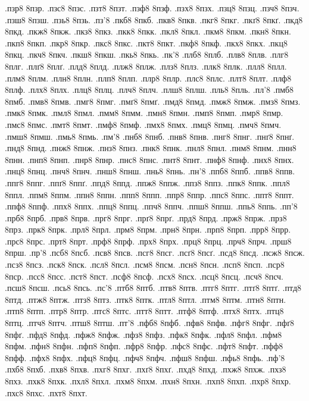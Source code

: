 {.пзр8 8пзр.
.пзс8 8пзс.
.пзт8 8пзт.
.пзф8 8пзф.
.пзх8 8пзх.
.пзц8 8пзц.
.пзч8 8пзч.
.пзш8 8пзш.
.пзь8 8пзь.
.пз'8
.пкб8 8пкб.
.пкв8 8пкв.
.пкг8 8пкг.
.пкґ8 8пкґ.
.пкд8 8пкд.
.пкж8 8пкж.
.пкз8 8пкз.
.пкк8 8пкк.
.пкл8 8пкл.
.пкм8 8пкм.
.пкн8 8пкн.
.пкп8 8пкп.
.пкр8 8пкр.
.пкс8 8пкс.
.пкт8 8пкт.
.пкф8 8пкф.
.пкх8 8пкх.
.пкц8 8пкц.
.пкч8 8пкч.
.пкш8 8пкш.
.пкь8 8пкь.
.пк'8
.плб8 8плб.
.плв8 8плв.
.плг8 8плг.
.плґ8 8плґ.
.плд8 8плд.
.плж8 8плж.
.плз8 8плз.
.плк8 8плк.
.плл8 8плл.
.плм8 8плм.
.плн8 8плн.
.плп8 8плп.
.плр8 8плр.
.плс8 8плс.
.плт8 8плт.
.плф8 8плф.
.плх8 8плх.
.плц8 8плц.
.плч8 8плч.
.плш8 8плш.
.пль8 8пль.
.пл'8
.пмб8 8пмб.
.пмв8 8пмв.
.пмг8 8пмг.
.пмґ8 8пмґ.
.пмд8 8пмд.
.пмж8 8пмж.
.пмз8 8пмз.
.пмк8 8пмк.
.пмл8 8пмл.
.пмм8 8пмм.
.пмн8 8пмн.
.пмп8 8пмп.
.пмр8 8пмр.
.пмс8 8пмс.
.пмт8 8пмт.
.пмф8 8пмф.
.пмх8 8пмх.
.пмц8 8пмц.
.пмч8 8пмч.
.пмш8 8пмш.
.пмь8 8пмь.
.пм'8
.пнб8 8пнб.
.пнв8 8пнв.
.пнг8 8пнг.
.пнґ8 8пнґ.
.пнд8 8пнд.
.пнж8 8пнж.
.пнз8 8пнз.
.пнк8 8пнк.
.пнл8 8пнл.
.пнм8 8пнм.
.пнн8 8пнн.
.пнп8 8пнп.
.пнр8 8пнр.
.пнс8 8пнс.
.пнт8 8пнт.
.пнф8 8пнф.
.пнх8 8пнх.
.пнц8 8пнц.
.пнч8 8пнч.
.пнш8 8пнш.
.пнь8 8пнь.
.пн'8
.ппб8 8ппб.
.ппв8 8ппв.
.ппг8 8ппг.
.ппґ8 8ппґ.
.ппд8 8ппд.
.ппж8 8ппж.
.ппз8 8ппз.
.ппк8 8ппк.
.ппл8 8ппл.
.ппм8 8ппм.
.ппн8 8ппн.
.ппп8 8ппп.
.ппр8 8ппр.
.ппс8 8ппс.
.ппт8 8ппт.
.ппф8 8ппф.
.ппх8 8ппх.
.ппц8 8ппц.
.ппч8 8ппч.
.ппш8 8ппш.
.ппь8 8ппь.
.пп'8
.прб8 8прб.
.прв8 8прв.
.прг8 8прг.
.прґ8 8прґ.
.прд8 8прд.
.прж8 8прж.
.прз8 8прз.
.прк8 8прк.
.прл8 8прл.
.прм8 8прм.
.прн8 8прн.
.прп8 8прп.
.прр8 8прр.
.прс8 8прс.
.прт8 8прт.
.прф8 8прф.
.прх8 8прх.
.прц8 8прц.
.прч8 8прч.
.прш8 8прш.
.пр'8
.псб8 8псб.
.псв8 8псв.
.псг8 8псг.
.псґ8 8псґ.
.псд8 8псд.
.псж8 8псж.
.псз8 8псз.
.пск8 8пск.
.псл8 8псл.
.псм8 8псм.
.псн8 8псн.
.псп8 8псп.
.пср8 8пср.
.псс8 8псс.
.пст8 8пст.
.псф8 8псф.
.псх8 8псх.
.псц8 8псц.
.псч8 8псч.
.псш8 8псш.
.псь8 8псь.
.пс'8
.птб8 8птб.
.птв8 8птв.
.птг8 8птг.
.птґ8 8птґ.
.птд8 8птд.
.птж8 8птж.
.птз8 8птз.
.птк8 8птк.
.птл8 8птл.
.птм8 8птм.
.птн8 8птн.
.птп8 8птп.
.птр8 8птр.
.птс8 8птс.
.птт8 8птт.
.птф8 8птф.
.птх8 8птх.
.птц8 8птц.
.птч8 8птч.
.птш8 8птш.
.пт'8
.пфб8 8пфб.
.пфв8 8пфв.
.пфг8 8пфг.
.пфґ8 8пфґ.
.пфд8 8пфд.
.пфж8 8пфж.
.пфз8 8пфз.
.пфк8 8пфк.
.пфл8 8пфл.
.пфм8 8пфм.
.пфн8 8пфн.
.пфп8 8пфп.
.пфр8 8пфр.
.пфс8 8пфс.
.пфт8 8пфт.
.пфф8 8пфф.
.пфх8 8пфх.
.пфц8 8пфц.
.пфч8 8пфч.
.пфш8 8пфш.
.пфь8 8пфь.
.пф'8
.пхб8 8пхб.
.пхв8 8пхв.
.пхг8 8пхг.
.пхґ8 8пхґ.
.пхд8 8пхд.
.пхж8 8пхж.
.пхз8 8пхз.
.пхк8 8пхк.
.пхл8 8пхл.
.пхм8 8пхм.
.пхн8 8пхн.
.пхп8 8пхп.
.пхр8 8пхр.
.пхс8 8пхс.
.пхт8 8пхт.
}
